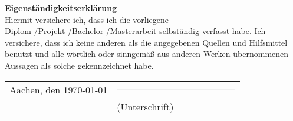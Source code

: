 {\Huge \textbf {Eigenständigkeitserklärung}} \\

\vspace*{1cm}
Hiermit versichere ich, dass ich die vorliegene Diplom-/Projekt-/Bachelor-/Masterarbeit selbständig verfasst habe. Ich versichere, dass ich keine anderen als die angegebenen Quellen und Hilfsmittel benutzt und alle wörtlich oder sinngemäß aus anderen Werken übernommenen Aussagen als solche gekennzeichnet habe.\\

\vspace*{1cm}\begin{tabular}{p{7cm}p{5cm}}
Aachen, den \today & $\rule{5cm}{0.01cm}$ \\
& (Unterschrift)
\end{tabular}







